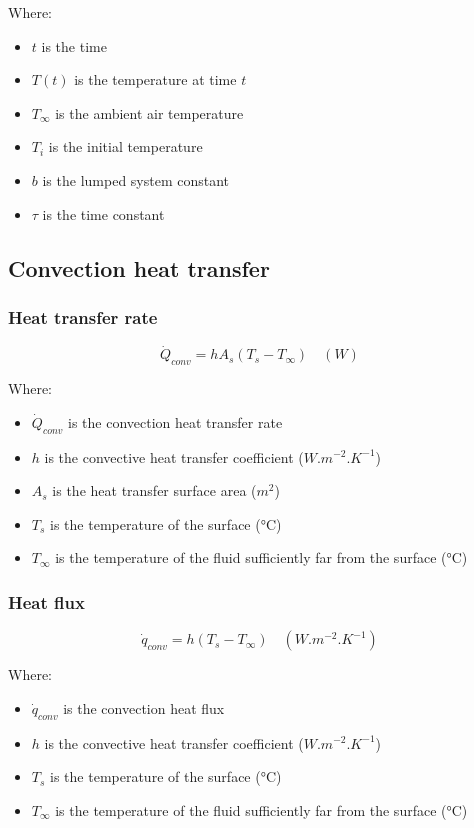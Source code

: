 \documentclass[11pt]{article}
\begin{document}
Where:
\begin{itemize}
\item \(t\) is the time
\item \(T(t)\) is the temperature at time \(t\)
\item \(T_{\infty}\) is the ambient air temperature
\item \(T_i\) is the initial temperature
\item \(b\) is the lumped system constant
\item \(\tau\) is the time constant
\end{itemize}

\subsection{Convection heat transfer}
\label{sec:org1ee590a}

\subsubsection{Heat transfer rate}
\label{sec:orga859c8f}
\[\dot{Q}_{conv} = h A_s (T_s - T_{\infty}) \quad (\unit{W})\]

Where:
\begin{itemize}
\item \(\dot{Q}_{conv}\) is the convection heat transfer rate
\item \(h\) is the convective heat transfer coefficient (\(\unit{W.m^{-2}.K^{-1}}\))
\item \(A_s\) is the heat transfer surface area (\(\unit{m^{2}}\))
\item \(T_s\) is the temperature of the surface (\(\unit{\degreeCelsius}\))
\item \(T_{\infty}\) is the temperature of the fluid sufficiently far from the surface (\(\unit{\degreeCelsius}\))
\end{itemize}

\subsubsection{Heat flux}
\label{sec:orgb1bc49d}
\[\dot{q}_{conv} = h (T_s - T_{\infty}) \quad (\unit{W.m^{-2}.K^{-1}})\]

Where:
\begin{itemize}
\item \(\dot{q}_{conv}\) is the convection heat flux
\item \(h\) is the convective heat transfer coefficient (\(\unit{W.m^{-2}.K^{-1}}\))
\item \(T_s\) is the temperature of the surface (\(\unit{\degreeCelsius}\))
\item \(T_{\infty}\) is the temperature of the fluid sufficiently far from the surface (\(\unit{\degreeCelsius}\))
\end{itemize}
\end{document}
